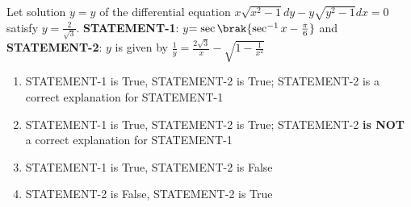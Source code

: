 \iffalse
\title{Assignment 2 - EE1030}
\author{ee24btech11018 - D. Swaraj Sharma}
\section{ar}
\fi
\item Let solution $y=y$ of the differential equation $x\sqrt{x^2-1}dy-y\sqrt{y^2-1}dx=0$ satisfy $y$$=\frac{2}{\sqrt3}$.
	\textbf{STATEMENT-1}: $y$$=\sec{\brak{\sec^{-1}{x}-\frac{\pi}{6}}}$ and 
\textbf{STATEMENT-2}: $y$ is given by $\frac{1}{y}=\frac{2\sqrt3}{x}-\sqrt{1-\frac{1}{x^2}}$ 

		\hfill{}
\begin{enumerate}
\item STATEMENT-1 is True, STATEMENT-2 is True; STATEMENT-2 is a correct explanation for STATEMENT-1
\item STATEMENT-1 is True, STATEMENT-2 is True; STATEMENT-2 \textbf{is NOT} a correct explanation for STATEMENT-1
\item STATEMENT-1 is True, STATEMENT-2 is False
\item STATEMENT-2 is False, STATEMENT-2 is True
\end{enumerate}

